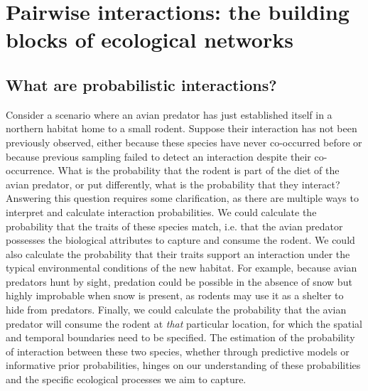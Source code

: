 \section{Pairwise interactions: the building blocks of ecological networks}

\subsection{What are probabilistic interactions?}

Consider a scenario where an avian predator has just established itself in a
northern habitat home to a small rodent. Suppose their interaction has not been
previously observed, either because these species have never co-occurred before
or because previous sampling failed to detect an interaction despite their
co-occurrence. What is the probability that the rodent is part of the diet of
the avian predator, or put differently, what is the probability that they
interact? Answering this question requires some clarification, as there are
multiple ways to interpret and calculate interaction probabilities. We could
calculate the probability that the traits of these species match, i.e. that the
avian predator possesses the biological attributes to capture and consume the
rodent. We could also calculate the probability that their traits support an
interaction under the typical environmental conditions of the new habitat. For
example, because avian predators hunt by sight, predation could be possible in
the absence of snow but highly improbable when snow is present, as rodents may
use it as a shelter to hide from predators. Finally, we could calculate the
probability that the avian predator will consume the rodent at \textit{that}
particular location, for which the spatial and temporal boundaries need to be
specified. The estimation of the probability of interaction between these two
species, whether through predictive models or informative prior probabilities,
hinges on our understanding of these probabilities and the specific ecological
processes we aim to capture. 

